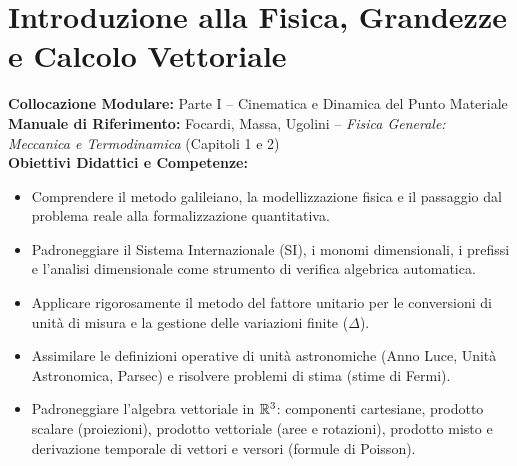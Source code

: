 \chapter{Introduzione alla Fisica, Grandezze e Calcolo Vettoriale}
\label{chap:introduzione_vettori}

\begin{tcolorbox}[enhanced, breakable, colback=navyblue!4!white, colframe=navyblue!80!black,
    coltitle=white, fonttitle=\bfseries\sffamily, title={Quadro Sinottico del Capitolo 01},
    sharp corners, rounded corners=south, boxrule=1pt]
\textbf{Collocazione Modulare:} Parte I -- Cinematica e Dinamica del Punto Materiale\\
\textbf{Manuale di Riferimento:} Focardi, Massa, Ugolini -- \emph{Fisica Generale: Meccanica e Termodinamica} (Capitoli 1 e 2)\\
\textbf{Obiettivi Didattici e Competenze:}\par
\begin{itemize}
    \item Comprendere il metodo galileiano, la modellizzazione fisica e il passaggio dal problema reale alla formalizzazione quantitativa.
    \item Padroneggiare il Sistema Internazionale (SI), i monomi dimensionali, i prefissi e l'analisi dimensionale come strumento di verifica algebrica automatica.
    \item Applicare rigorosamente il metodo del fattore unitario per le conversioni di unità di misura e la gestione delle variazioni finite ($\Delta$).
    \item Assimilare le definizioni operative di unità astronomiche (Anno Luce, Unità Astronomica, Parsec) e risolvere problemi di stima (stime di Fermi).
    \item Padroneggiare l'algebra vettoriale in $\mathbb{R}^3$: componenti cartesiane, prodotto scalare (proiezioni), prodotto vettoriale (aree e rotazioni), prodotto misto e derivazione temporale di vettori e versori (formule di Poisson).
\end{itemize}
\end{tcolorbox}

\vspace{0.5em}

